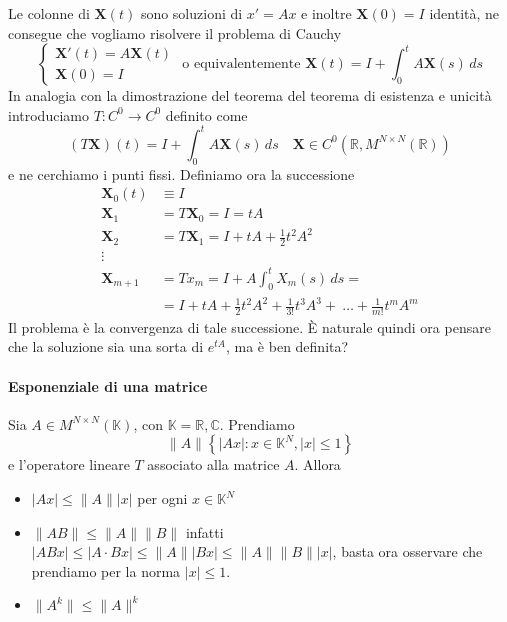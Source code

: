 Le colonne di \(\mathbf{X} {(t)}\) sono soluzioni di \(x' = Ax\) e inoltre
\(\mathbf{X} {(0)} = I\) identità, ne consegue che vogliamo risolvere il
problema di Cauchy
\begin{equation}\label{eq:cauchy_autonomo_omoglin}
    \begin{cases}
        \mathbf{X}'{(t)} = A\mathbf{X} {(t)} \\
        \mathbf{X} {(0)} = I 
    \end{cases}
    \text{ o equivalentemente }
    \mathbf{X} {(t)} = I + \int_{0}^{t} A\mathbf{X} {(s)}\,ds
\end{equation}
In analogia con la dimostrazione del teorema del teorema di esistenza e unicità
introduciamo \(T : C^{0} \to C^{0}\) definito come
\[
    (T\mathbf{X}){(t)} = I + \int_{0}^{t} A\mathbf{X} {(s)}\,ds \quad \mathbf{X}
    \in C^{0}{(\mathbb{R}, M^{N \times N}{(\mathbb{R})})}
\]
e ne cerchiamo i punti fissi. Definiamo ora la successione
\begin{align*}
    \mathbf{X}_0{(t)} &\equiv I \\
    \mathbf{X}_1 &= T\mathbf{X}_0 = I = tA \\
    \mathbf{X}_2 &= T\mathbf{X}_1 = I + tA + \frac{1}{2}t^2A^2 \\
    \vdots \\
    \mathbf{X}_{m+1} &= Tx_{m} = I + A \int_{0}^{t} X_{m} {(s)}\,ds = \\ &= I + tA +
    \frac{1}{2}t^2 A^2 + \frac{1}{3!}t^3 A^3 +~\dots + \frac{1}{m!}t^m A^m
\end{align*}
Il problema è la convergenza di tale successione. È naturale quindi ora
pensare che la soluzione sia una sorta di \(e^{tA}\), ma è ben definita?

\paragraph{Esponenziale di una matrice} Sia \(A \in M^{N \times
N}{(\mathbb{K})}\), con \(\mathbb{K} = \mathbb{R}, \mathbb{C}\). Prendiamo 
\[
    \|A\| \left\{ |Ax| : x \in \mathbb{K}^{N}, |x| \le 1 \right\} 
\]
e l'operatore lineare \(T\) associato alla matrice \(A\). Allora
\begin{itemize}[label = --]
    \item \(|Ax| \le \|A\||x|\) per ogni \(x \in \mathbb{K}^{N}\)
    \item \(\|AB\| \le \|A\|\|B\|\) infatti \(|ABx| \le |A\cdot Bx| \le
        \|A\||Bx| \le \|A\|\|B\||x|\), basta ora osservare che prendiamo per la
        norma \(|x| \le 1\).
    \item \(\|A^{k}\| \le \|A\|^{k}\) 
\end{itemize}

